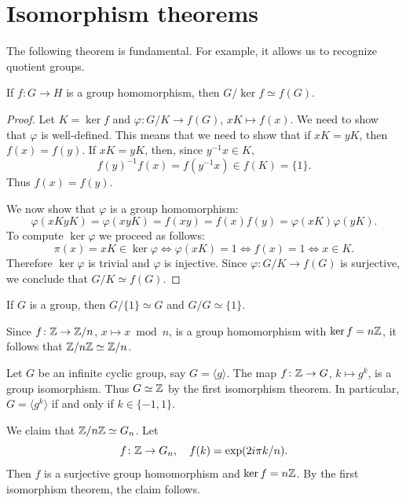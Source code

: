 \section{Isomorphism theorems}
\lecture\label{sec:iso}

The following theorem is fundamental. For example, it allows us to recognize quotient groups. 

\begin{theorem}
If $f\colon G\to H$ is a group homomorphism, then $G/\ker f\simeq f(G)$.
\end{theorem}

\begin{proof}
    Let $K=\ker f$ and $\varphi\colon G/K\to f(G)$, $xK\mapsto f(x)$. We need to show that $\varphi$ is well-defined. This means that
    we need to show that if $xK=yK$, then $f(x)=f(y)$. If $xK=yK$, then, since $y^{-1}x\in K$, 
    \[
        f(y)^{-1}f(x)=f(y^{-1}x)\in f(K)=\{1\}.
    \]
    Thus $f(x)=f(y)$.

    We now show that $\varphi$ is a group homomorphism: 
        \[
        \varphi(xKyK)=\varphi(xyK)=f(xy)=f(x)f(y)=\varphi(xK)\varphi(yK).
        \]
    To compute $\ker\varphi$ we proceed as follows: 
        \[
        \pi(x)=xK\in\ker\varphi\Longleftrightarrow \varphi(xK)=1
        \Longleftrightarrow f(x)=1
        \Longleftrightarrow x\in K.
        \]
    Therefore  $\ker\varphi$ is trivial and
    $\varphi$ is injective. Since $\varphi\colon G/K\to f(G)$ is surjective, 
    we conclude that $G/K\simeq f(G)$.
\end{proof}

If $G$ is a group, then $G/\{1\}\simeq G$ and $G/G\simeq\{1\}$.

\begin{example}
Since $f\colon\mathbb{Z}\to\mathbb{Z}/n$, $x\mapsto x\bmod n$, is a group homomorphism
with $\ker f=n\mathbb{Z}$, it follows that 
$\mathbb{Z}/n\mathbb{Z}\simeq\mathbb{Z}/n$.
\end{example}

\begin{example}
Let $G$ be an infinite cyclic group, say $G=\langle g\rangle$. The map 
$f \colon\mathbb{Z}\to G$, $k\mapsto g^k$,
is a group isomorphism. Thus $G\simeq\mathbb{Z}$ by the first isomorphism theorem. In particular, $G=\langle g^k\rangle$ if and only if 
 $k\in\{-1,1\}$.
\end{example}

\begin{example}
We claim that $\mathbb{Z}/n\mathbb{Z}\simeq G_n$. Let 
\[
f\colon\mathbb{Z}\to G_n,\quad
f(k)=\exp(2i\pi k/n).
\]
Then $f$ is a surjective group homomorphism and
$\ker f=n\mathbb{Z}$. By the first isomorphism theorem, the claim follows. 
\end{example}

